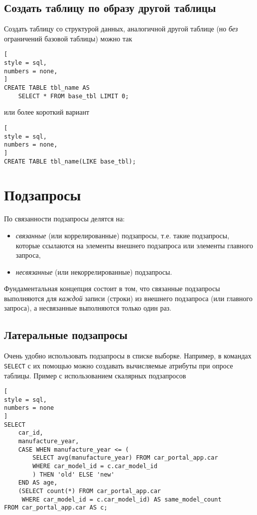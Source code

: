 \documentclass[%
	11pt,
	a4paper,
	utf8,
		]{article}
\begin{document}
\subsection{Создать таблицу по образу другой таблицы}

Создать таблицу со структурой данных, аналогичной другой таблице (но \emph{без} ограничений базовой таблицы) можно так
\begin{lstlisting}[
style = sql,
numbers = none,
]
CREATE TABLE tbl_name AS
    SELECT * FROM base_tbl LIMIT 0;
\end{lstlisting}  
или более короткий вариант
\begin{lstlisting}[
style = sql,
numbers = none,
]
CREATE TABLE tbl_name(LIKE base_tbl);
\end{lstlisting}

\section{Подзапросы}

По связанности подзапросы делятся на:
\begin{itemize}
	\item \emph{связанные} (или коррелированные) подзапросы, т.е. такие подзапросы, которые ссылаются на элементы внешнего подзапроса или элементы главного запроса,
	
	\item \emph{несвязанные} (или некоррелированные) подзапросы.
\end{itemize}

Фундаментальная концепция состоит в том, что связанные подзапросы выполняются для \emph{каждой} записи (строки) из внешнего подзапроса (или главного запроса), а несвязанные выполняются только один раз.

\subsection{Латеральные подзапросы}

Очень удобно использовать подзапросы в списке выборке. Например, в командах \texttt{SELECT} с их помощью можно создавать вычисляемые атрибуты при опросе таблицы. Пример с использованием скалярных подзапросов
\begin{lstlisting}[
style = sql,
numbers = none
]
SELECT
    car_id,
    manufacture_year,
    CASE WHEN manufacture_year <= (
        SELECT avg(manufacture_year) FROM car_portal_app.car
        WHERE car_model_id = c.car_model_id
        ) THEN 'old' ELSE 'new'
    END AS age,
    (SELECT count(*) FROM car_portal_app.car
     WHERE car_model_id = c.car_model_id) AS same_model_count
FROM car_portal_app.car AS c;
\end{lstlisting}
\end{document}
